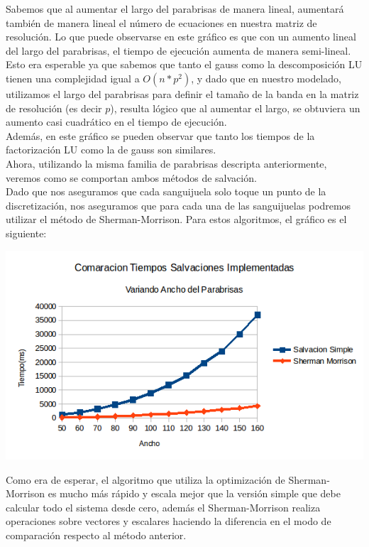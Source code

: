 Sabemos que al aumentar el largo del parabrisas de manera lineal, aumentará también de manera lineal el número de ecuaciones en nuestra matriz de resolución. Lo que puede observarse en este gráfico es que con un aumento lineal del largo del parabrisas, el tiempo de ejecución aumenta de manera semi-lineal. Esto era esperable ya que sabemos que tanto el gauss como la descomposición LU tienen una complejidad igual a $O(n*p^2)$, y dado que en nuestro modelado, utilizamos el largo del parabrisas para definir el tamaño de la banda en la matriz de resolución (es decir $p$), resulta lógico que al aumentar el largo, se obtuviera un aumento casi cuadrático en el tiempo de ejecución.
\\
Además, en este gráfico se pueden observar que tanto los tiempos de la factorización LU como la de gauss son similares.
\\
Ahora, utilizando la misma familia de parabrisas descripta anteriormente, veremos como se comportan ambos métodos de salvación.
\\
Dado que nos aseguramos que cada sanguijuela solo toque un punto de la discretización, nos aseguramos que para cada una de las sanguijuelas podremos utilizar el método de Sherman-Morrison. Para estos algoritmos, el gráfico es el siguiente:
\\
\begin{center}
 \includegraphics[width=400pt]{imagenes/testeo/anchoSalv.png}
\end{center}

Como era de esperar, el algoritmo que utiliza la optimización de Sherman-Morrison es mucho más rápido y escala mejor que la versión simple que debe calcular todo el sistema desde cero, además el Sherman-Morrison realiza operaciones sobre vectores y escalares haciendo la diferencia en el modo de comparación respecto al método anterior.

